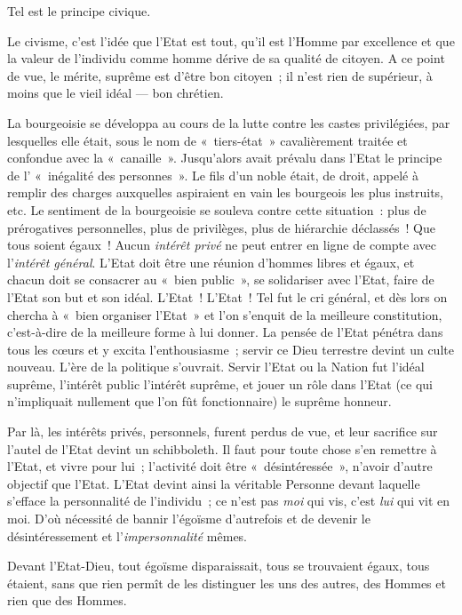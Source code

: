 \documentclass[french,twoside]{book} %
\begin{document}
Tel est le principe civique.\par
Le civisme, c’est l’idée que l’Etat est tout, qu’il est l’Homme par excellence et que la valeur de l’individu comme homme dérive de sa qualité de citoyen. A ce point de vue, le mérite, suprême est d’être bon citoyen ; il n’est rien de supérieur, à moins que le vieil idéal — bon chrétien.\par
La bourgeoisie se développa au cours de la lutte contre les castes privilégiées, par lesquelles elle était, sous le nom de « tiers-état » cavalièrement traitée et confondue avec la « canaille ». Jusqu’alors avait prévalu dans l’Etat le principe de l’ « inégalité des personnes ». Le fils d’un noble était, de droit, appelé à remplir des charges auxquelles aspiraient en vain les bourgeois les plus instruits, etc. Le sentiment de la bourgeoisie se souleva contre cette situation : plus de prérogatives personnelles, plus de privilèges, plus  de hiérarchie déclassés ! Que tous soient égaux ! Aucun \emph{intérêt privé} ne peut entrer en ligne de compte avec l’\emph{intérêt général}. L’Etat doit être une réunion d’hommes libres et égaux, et chacun doit se consacrer au « bien public », se solidariser avec l’Etat, faire de l’Etat son but et son idéal. L’Etat ! L’Etat ! Tel fut le cri général, et dès lors on chercha à « bien organiser l’Etat » et l’on s’enquit de la meilleure constitution, c’est-à-dire de la meilleure forme à lui donner. La pensée de l’Etat pénétra dans tous les cœurs et y excita l’enthousiasme ; servir ce Dieu terrestre devint un culte nouveau. L’ère de la politique s’ouvrait. Servir l’Etat ou la Nation fut l’idéal suprême, l’intérêt public l’intérêt suprême, et jouer un rôle dans l’Etat (ce qui n’impliquait nullement que l’on fût fonctionnaire) le suprême honneur.\par
Par là, les intérêts privés, personnels, furent perdus de vue, et leur sacrifice sur l’autel de l’Etat devint un schibboleth. Il faut pour toute chose s’en remettre à l’Etat, et vivre pour lui ; l’activité doit être « désintéressée », n’avoir d’autre objectif que l’Etat. L’Etat devint ainsi la véritable Personne devant laquelle s’efface la personnalité de l’individu ; ce n’est pas \emph{moi} qui vis, c’est \emph{lui} qui vit en moi. D’où nécessité de bannir l’égoïsme d’autrefois et de devenir le désintéressement et l’\emph{impersonnalité} mêmes.\par
Devant l’Etat-Dieu, tout égoïsme disparaissait, tous se trouvaient égaux, tous étaient, sans que rien permît de les distinguer les uns des autres, des Hommes et rien que des Hommes.\par
\end{document}
